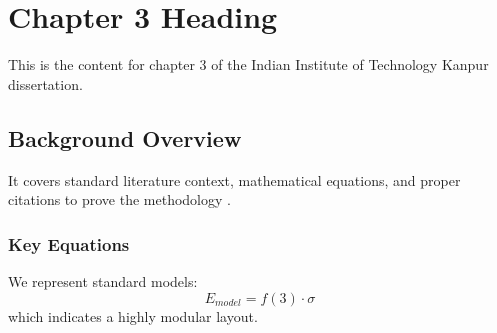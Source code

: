 \chapter{Chapter 3 Heading}
\label{ch:chapter3}
This is the content for chapter 3 of the Indian Institute of Technology Kanpur dissertation.

\section{Background Overview}
It covers standard literature context, mathematical equations, and proper citations to prove the methodology \cite{texbook}.

\subsection{Key Equations}
We represent standard models:
\begin{equation}
    E_{model} = f(3) \cdot \sigma
\end{equation}
which indicates a highly modular layout.
